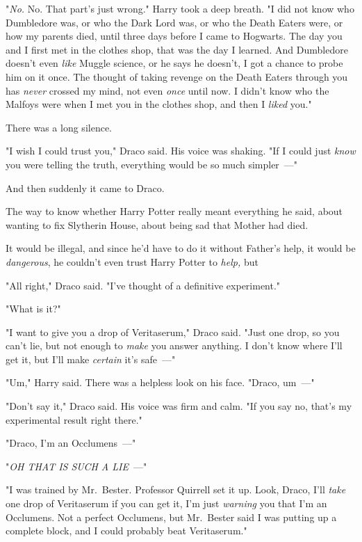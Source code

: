 "\emph{No.} No. That part's just wrong." Harry took a deep breath. "I did not
know who Dumbledore was, or who the Dark Lord was, or who the Death Eaters
were, or how my parents died, until three days before I came to Hogwarts. The
day you and I first met in the clothes shop, that was the day I learned. And
Dumbledore doesn't even \emph{like} Muggle science, or he says he doesn't, I
got a chance to probe him on it once. The thought of taking revenge on the
Death Eaters through you has \emph{never} crossed my mind, not even \emph{once}
until now. I didn't know who the Malfoys were when I met you in the clothes
shop, and then I \emph{liked} you."

There was a long silence.

"I wish I could trust you," Draco said. His voice was shaking. "If I could just
\emph{know} you were telling the truth, everything would be so much simpler~---"

And then suddenly it came to Draco.

The way to know whether Harry Potter really meant everything he said, about
wanting to fix Slytherin House, about being sad that Mother had died.

It would be illegal, and since he'd have to do it without Father's help, it
would be \emph{dangerous}, he couldn't even trust Harry Potter to \emph{help,}
but{\el}

"All right," Draco said. "I've thought of a definitive experiment."

"What is it?"

"I want to give you a drop of Veritaserum," Draco said. "Just one drop, so you
can't lie, but not enough to \emph{make} you answer anything. I don't know
where I'll get it, but I'll make \emph{certain} it's safe~---"

"Um," Harry said. There was a helpless look on his face. "Draco, um~---"

"Don't say it," Draco said. His voice was firm and calm. "If you say no, that's
my experimental result right there."

"Draco, I'm an Occlumens~---"

"\emph{OH THAT IS SUCH A LIE}~---"

"I was trained by Mr.~Bester. Professor Quirrell set it up. Look, Draco, I'll
\emph{take} one drop of Veritaserum if you can get it, I'm just \emph{warning}
you that I'm an Occlumens. Not a perfect Occlumens, but Mr.~Bester said I was
putting up a complete block, and I could probably beat Veritaserum."

